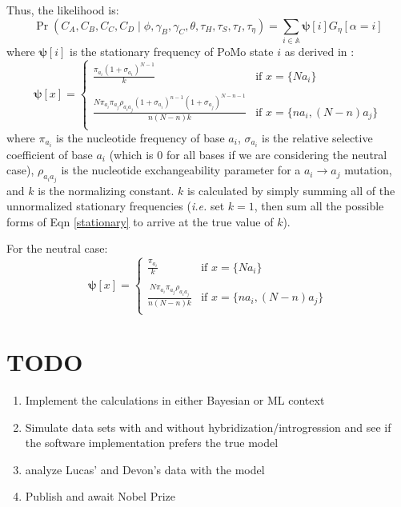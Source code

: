 \documentclass{article}
\begin{document}
Thus, the likelihood is:
\begin{equation}
\Pr\left(C_A,C_B,C_C, C_D\mid \phi, \gamma_B, \gamma_C, \theta, \tau_H, \tau_S, \tau_I, \tau_{\eta}\right)  = \sum_{i\in \mathbb{A}} {\bm \psi}[i] G_{\eta}[\alpha=i]
\end{equation}
where ${\bm \psi}[i]$ is the stationary frequency of PoMo state $i$ as derived in \cite{BorgesSK2019}:
\begin{equation}
{\bm \psi}[x] = \left\{
  \begin{array}{rl}
    \frac{\pi_{a_i} \left(1 + \sigma_{a_i}\right)^{N-1}}{k}& \mbox{if } x=\{Na_i\} \\
    & \\
    \frac{N\pi_{a_i}\pi_{a_j}\rho_{a_i a_j} \left(1 + \sigma_{a_i}\right)^{n-1}\left(1 + \sigma_{a_j}\right)^{N-n-1}}{n(N-n)k} & \mbox{if }x=\{na_i, (N-n)a_j\} \\
  \end{array}\right.\label{stationary}
\end{equation}
where $\pi_{a_i}$ is the nucleotide frequency of base $a_i$, $\sigma_{a_i}$ is the relative selective coefficient of base $a_i$ (which is 0 for all bases if we are considering the neutral case), $\rho_{a_i a_j}$ is the nucleotide exchangeability parameter for a $a_i\rightarrow a_j$ mutation, and $k$
is the normalizing constant.
$k$ is calculated by simply summing all of the unnormalized stationary frequencies ({\em i.e.} set $k=1$, then sum all the possible forms of Eqn \ref{stationary} to arrive at the true value of $k$). 

For the neutral case:
\begin{equation}
{\bm \psi}[x] = \left\{
  \begin{array}{rl}
    \frac{\pi_{a_i} }{k}& \mbox{if } x=\{Na_i\} \\
    & \\
    \frac{N\pi_{a_i}\pi_{a_j} \rho_{a_i a_j}}{n(N-n)k} & \mbox{if }x=\{na_i, (N-n)a_j\} \\
  \end{array}\right.\label{stationaryneutral}
\end{equation}



\section{TODO}
\begin{enumerate}
    \item Implement the calculations in either Bayesian or ML context
    \item Simulate data sets with and without hybridization/introgression and see if the software implementation prefers the true model
    \item analyze Lucas' and Devon's data with the model
    \item Publish and await Nobel Prize
\end{enumerate}



\end{document}

